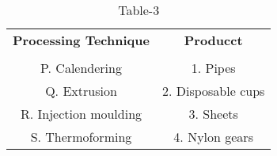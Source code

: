 \begin{table}[htbp]
  \centering
  \caption{Table-3}
  \label{table3}
  \begin{tabular}{cc}
  \textbf{Processing Technique} & \textbf{Producct} \\ \\
    P. Calendering & 1. Pipes \\
    Q. Extrusion & 2. Disposable cups \\
    R. Injection moulding & 3. Sheets \\
    S. Thermoforming & 4. Nylon gears \\
  \end{tabular}
\end{table}